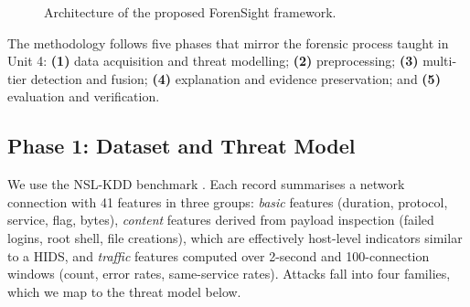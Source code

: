 \documentclass[12pt,a4paper,oneside]{article}
\begin{document}
\begin{figure}[H]
{}
\caption{Architecture of the proposed ForenSight framework.}\label{fig:arch}
\end{figure}

The methodology follows five phases that mirror the forensic process taught in Unit 4: \textbf{(1)} data acquisition and threat modelling; \textbf{(2)} preprocessing; \textbf{(3)} multi-tier detection and fusion; \textbf{(4)} explanation and evidence preservation; and \textbf{(5)} evaluation and verification.

\subsection{Phase 1: Dataset and Threat Model}\label{sec:data}
We use the NSL-KDD benchmark \cite{tavallaee2009detailed}. Each record summarises a network connection with 41 features in three groups: \emph{basic} features (duration, protocol, service, flag, bytes), \emph{content} features derived from payload inspection (failed logins, root shell, file creations), which are effectively host-level indicators similar to a HIDS, and \emph{traffic} features computed over 2-second and 100-connection windows (count, error rates, same-service rates). Attacks fall into four families, which we map to the threat model below.
\end{document}
